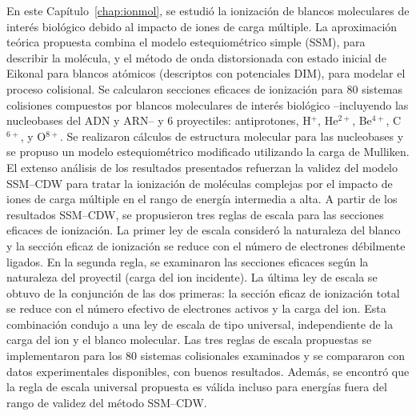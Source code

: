 En este Capítulo~\ref{chap:ionmol}, se estudió la ionización de blancos 
moleculares de interés biológico debido al impacto de iones de carga 
múltiple. La aproximación teórica propuesta combina el modelo 
estequiométrico simple (SSM), para describir la molécula, y el método de 
onda distorsionada con estado inicial de Eikonal para blancos atómicos 
(descriptos con potenciales DIM), para modelar el proceso colisional. Se 
calcularon secciones eficaces de ionización para 80 sistemas colisiones
compuestos por blancos moleculares de interés biológico --incluyendo 
las nucleobases del ADN y ARN-- y 6 proyectiles: antiprotones, H$^{+}$, 
He$^{2+}$, Be$^{4+}$, C$^{6+}$, y O$^{8+}$. 
Se realizaron cálculos de estructura molecular para las nucleobases y se 
propuso un modelo estequiométrico modificado utilizando la carga de 
Mulliken. El extenso análisis de los resultados 
presentados refuerzan la validez del modelo SSM--CDW para tratar la 
ionización de moléculas complejas por el impacto de iones de carga 
múltiple en el rango de energía intermedia a alta. 
A partir de los resultados SSM--CDW, se propusieron tres reglas de 
escala para las secciones eficaces de ionización. 
La primer ley de escala consideró la naturaleza del blanco y la sección 
eficaz de ionización se reduce con el número de electrones débilmente 
ligados. En la segunda regla, se examinaron las secciones eficaces según 
la naturaleza del proyectil (carga del ion incidente). La última ley de 
escala se obtuvo de la conjunción de las dos primeras: la sección eficaz 
de ionización total se reduce con el número efectivo de electrones 
activos y la carga del ion. Esta combinación condujo a una 
ley de escala de tipo universal, independiente de la carga del ion y el 
blanco molecular. Las tres reglas de escala propuestas se implementaron 
para los 80 sistemas colisionales examinados y se compararon con datos 
experimentales disponibles, con buenos resultados. 
Además, se encontró que la regla de escala universal propuesta es válida 
incluso para energías fuera del rango de validez del método SSM--CDW.



